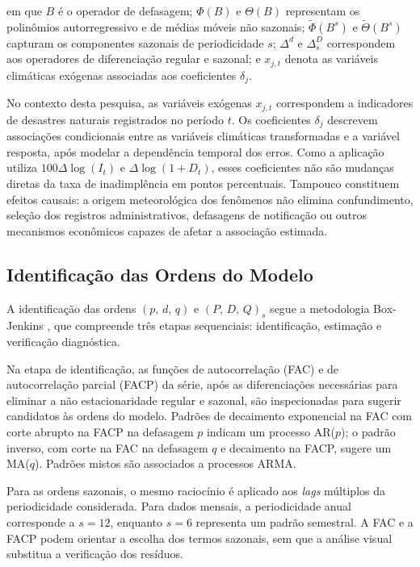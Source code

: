\noindent
em que \(B\) é o operador de defasagem; \(\Phi(B)\) e \(\Theta(B)\) representam
os polinômios autorregressivo e de médias móveis não sazonais; \(\tilde{\Phi}(B^s)\)
e \(\tilde{\Theta}(B^s)\) capturam os componentes sazonais de periodicidade
\(s\); \(\Delta^d\) e \(\Delta_s^D\) correspondem aos operadores de
diferenciação regular e sazonal; e \(x_{j,t}\) denota as variáveis climáticas
exógenas associadas aos coeficientes \(\delta_j\).
 
No contexto desta pesquisa, as variáveis exógenas \(x_{j,t}\) correspondem
a indicadores de desastres naturais registrados no período \(t\). Os
coeficientes \(\delta_j\) descrevem associações condicionais entre as variáveis
climáticas transformadas e a variável resposta, após modelar a dependência
temporal dos erros. Como a aplicação utiliza \(100\Delta\log(I_t)\) e
\(\Delta\log(1+D_t)\), esses coeficientes não são mudanças diretas da taxa
de inadimplência em pontos percentuais. Tampouco constituem efeitos causais:
a origem meteorológica dos fenômenos não elimina confundimento, seleção dos
registros administrativos, defasagens de notificação ou outros mecanismos
econômicos capazes de afetar a associação estimada.
 
\subsection{Identificação das Ordens do Modelo}
\label{sec:sarimax_id}
 
A identificação das ordens \((p,\,d,\,q)\) e \((P,\,D,\,Q)_s\) segue a
metodologia Box-Jenkins \citep{box2015}, que compreende três etapas
sequenciais: identificação, estimação e verificação diagnóstica.
 
Na etapa de identificação, as funções de autocorrelação (FAC) e de
autocorrelação parcial (FACP) da série, após as diferenciações necessárias
para eliminar a não estacionaridade regular e sazonal, são inspecionadas
para sugerir candidatos às ordens do modelo. Padrões de decaimento
exponencial na FAC com corte abrupto na FACP na defasagem \(p\) indicam
um processo AR(\(p\)); o padrão inverso, com corte na FAC na defasagem
\(q\) e decaimento na FACP, sugere um MA(\(q\)). Padrões mistos são
associados a processos ARMA.
 
Para as ordens sazonais, o mesmo raciocínio é aplicado aos \textit{lags}
múltiplos da periodicidade considerada. Para dados mensais, a periodicidade
anual corresponde a \(s=12\), enquanto \(s=6\) representa um padrão
semestral. A FAC e a FACP podem orientar a escolha dos termos sazonais,
sem que a análise visual substitua a verificação dos resíduos.
 
